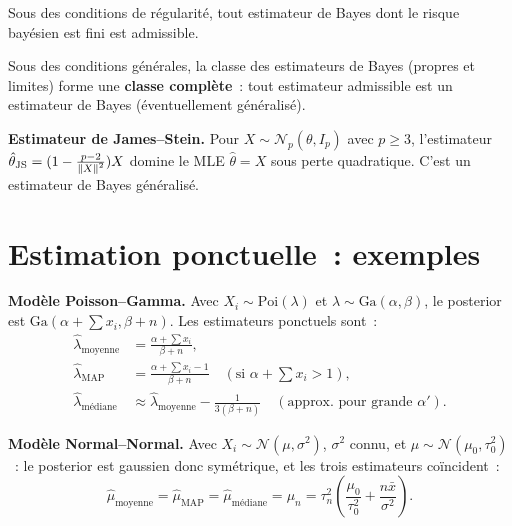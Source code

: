 \begin{theoreme}
Sous des conditions de r\'egularit\'e, tout estimateur de Bayes dont le
risque bay\'esien est fini est admissible.
\end{theoreme}

\begin{theoreme}
Sous des conditions g\'en\'erales, la classe des estimateurs de Bayes
(propres et limites) forme une \textbf{classe compl\`ete}~: tout
estimateur admissible est un estimateur de Bayes (\'eventuellement
g\'en\'eralis\'e).
\end{theoreme}

\begin{exemple}
\textbf{Estimateur de James--Stein.} Pour $X \sim \mathcal{N}_p(\theta, I_p)$
avec $p \geq 3$, l'estimateur $\hat{\theta}_{\text{JS}} = (1 - \frac{p-2}{\left\| X \right\|^2})X$
domine le MLE $\hat{\theta} = X$ sous perte quadratique. C'est un
estimateur de Bayes g\'en\'eralis\'e.
\end{exemple}

\section{Estimation ponctuelle~: exemples}

\begin{exemple}
\textbf{Mod\`ele Poisson--Gamma.}
Avec $X_i \sim \text{Poi}(\lambda)$ et $\lambda \sim \text{Ga}(\alpha, \beta)$,
le posterior est $\text{Ga}(\alpha + \sum x_i, \beta + n)$. Les
estimateurs ponctuels sont~:
\begin{align*}
  \hat{\lambda}_{\text{moyenne}} &= \frac{\alpha + \sum x_i}{\beta + n}, \\
  \hat{\lambda}_{\text{MAP}} &= \frac{\alpha + \sum x_i - 1}{\beta + n}
  \quad (\text{si } \alpha + \sum x_i > 1), \\
  \hat{\lambda}_{\text{m\'ediane}} &\approx \hat{\lambda}_{\text{moyenne}}
  - \frac{1}{3(\beta + n)} \quad (\text{approx. pour grande } \alpha').
\end{align*}
\end{exemple}

\begin{exemple}
\textbf{Mod\`ele Normal--Normal.}
Avec $X_i \sim \mathcal{N}(\mu, \sigma^2)$, $\sigma^2$ connu, et
$\mu \sim \mathcal{N}(\mu_0, \tau_0^2)$~: le posterior est gaussien
donc sym\'etrique, et les trois estimateurs co\"incident~:
\[
  \hat{\mu}_{\text{moyenne}} = \hat{\mu}_{\text{MAP}} = \hat{\mu}_{\text{m\'ediane}}
  = \mu_n = \tau_n^2\left(\frac{\mu_0}{\tau_0^2} + \frac{n\bar{x}}{\sigma^2}\right).
\]
\end{exemple}

